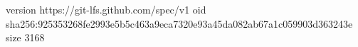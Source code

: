 version https://git-lfs.github.com/spec/v1
oid sha256:925353268fe2993e5b5c463a9eca7320e93a45da082ab67a1c059903d363243e
size 3168
